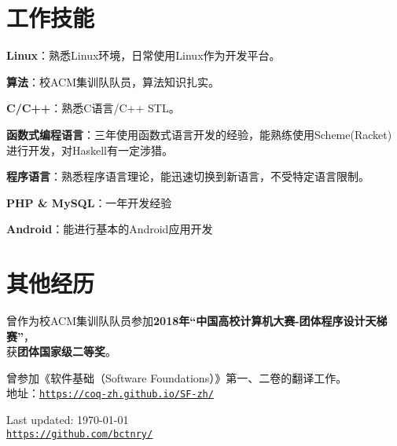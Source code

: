 \documentclass[a4paper]{article}
\def\footerlink{https://github.com/bctnry/}
\renewenvironment{itemize}{
  \begin{list}{}{
    \setlength{\leftmargin}{1.5em}
  }
}{
  \end{list}
}
\begin{document}
\section*{工作技能}

\begin{itemize}
  \item{\textbf{Linux}：熟悉Linux环境，日常使用Linux作为开发平台。}
  \item{\textbf{算法}：校ACM集训队队员，算法知识扎实。}
  \item{\textbf{C/C++}：熟悉C语言/C++ STL。}
  \item{\textbf{函数式编程语言}：三年使用函数式语言开发的经验，能熟练使用Scheme(Racket)进行开发，对Haskell有一定涉猎。}
  \item{\textbf{程序语言}：熟悉程序语言理论，能迅速切换到新语言，不受特定语言限制。}
  \item{\textbf{PHP \& MySQL}：一年开发经验}
  \item{\textbf{Android}：能进行基本的Android应用开发}
\end{itemize}
  

\section*{其他经历}

\begin{itemize}
  \item{曾作为校ACM集训队队员参加\textbf{2018年“中国高校计算机大赛-团体程序设计天梯赛”}，\\获\textbf{团体国家级二等奖}。}
  \item{曾参加《软件基础（Software Foundations）》第一、二卷的翻译工作。\\
  地址：\href{https://coq-zh.github.io/SF-zh/}{\tt https://coq-zh.github.io/SF-zh/}}
\end{itemize}

\bigskip

\begin{center}
  \begin{footnotesize}
    Last updated: \today \\
    \href{\footerlink}{\texttt{\footerlink}}
  \end{footnotesize}
\end{center}
\end{document}
